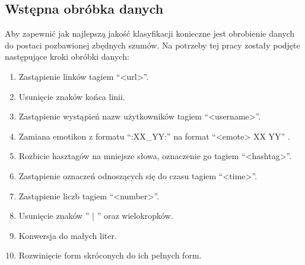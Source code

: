 \subsection{Wstępna obróbka danych}

Aby zapewnić jak najlepszą jakość klasyfikacji konieczne jest obrobienie danych do postaci pozbawionej zbędnych szumów. Na potrzeby tej pracy zostały podjęte następujące kroki obróbki danych:


\begin{enumerate}
    \item Zastąpienie linków tagiem “<url>”.
    \item Usunięcie znaków końca linii.
    \item Zastąpienie wystąpień nazw użytkowników tagiem  “<username>”.
    \item Zamiana emotikon z formatu “:XX\_YY:” na format “<emote> XX YY” .
    \item Rozbicie hasztagów na mniejsze słowa, oznaczenie go tagiem “<hashtag>”.
    \item Zastąpienie oznaczeń odnoszących się do czasu tagiem “<time>”.
    \item Zastąpienie liczb tagiem “<number>”.
    \item Usunięcie znaków  '' | ''  oraz wielokropków.
    \item Konwersja do małych liter.
    \item Rozwinięcie form skróconych do ich pełnych form.
\end{enumerate}

